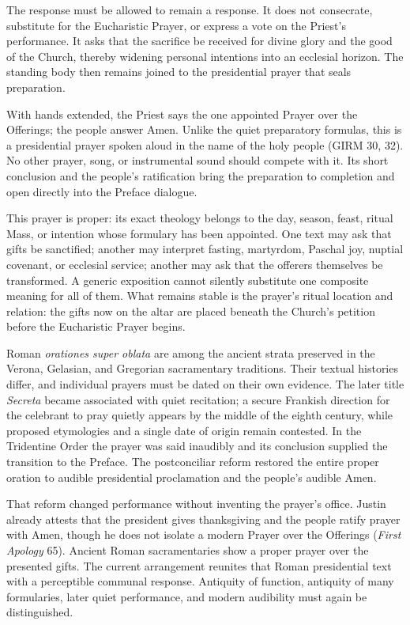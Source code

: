 The response must be allowed to remain a response. It does not consecrate, substitute for the Eucharistic Prayer, or express a vote on the Priest's performance. It asks that the sacrifice be received for divine glory and the good of the Church, thereby widening personal intentions into an ecclesial horizon. The standing body then remains joined to the presidential prayer that seals preparation.


With hands extended, the Priest says the one appointed Prayer over the Offerings; the people answer Amen. Unlike the quiet preparatory formulas, this is a presidential prayer spoken aloud in the name of the holy people (GIRM 30, 32). No other prayer, song, or instrumental sound should compete with it. Its short conclusion and the people's ratification bring the preparation to completion and open directly into the Preface dialogue.

This prayer is proper: its exact theology belongs to the day, season, feast, ritual Mass, or intention whose formulary has been appointed. One text may ask that gifts be sanctified; another may interpret fasting, martyrdom, Paschal joy, nuptial covenant, or ecclesial service; another may ask that the offerers themselves be transformed. A generic exposition cannot silently substitute one composite meaning for all of them. What remains stable is the prayer's ritual location and relation: the gifts now on the altar are placed beneath the Church's petition before the Eucharistic Prayer begins.

Roman \emph{orationes super oblata} are among the ancient strata preserved in the Verona, Gelasian, and Gregorian sacramentary traditions. Their textual histories differ, and individual prayers must be dated on their own evidence. The later title \emph{Secreta} became associated with quiet recitation; a secure Frankish direction for the celebrant to pray quietly appears by the middle of the eighth century, while proposed etymologies and a single date of origin remain contested. In the Tridentine Order the prayer was said inaudibly and its conclusion supplied the transition to the Preface. The postconciliar reform restored the entire proper oration to audible presidential proclamation and the people's audible Amen.

That reform changed performance without inventing the prayer's office. Justin already attests that the president gives thanksgiving and the people ratify prayer with Amen, though he does not isolate a modern Prayer over the Offerings (\emph{First Apology} 65). Ancient Roman sacramentaries show a proper prayer over the presented gifts. The current arrangement reunites that Roman presidential text with a perceptible communal response. Antiquity of function, antiquity of many formularies, later quiet performance, and modern audibility must again be distinguished.

